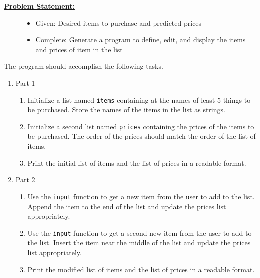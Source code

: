 \documentclass[12pt]{article}
\begin{document}
\begin{description}[labelindent=1cm]
\begin{description}
      
   \item[\textbf{\underline{Problem Statement:}}] \hfill \vspace{0mm}

	\begin{itemize}

		\item Given: Desired items to purchase and predicted prices
		
		\item Complete: Generate a program to define, edit, and display the items and prices of item in the list
	\end{itemize}      


	\end{description}


\newpage
\item[\textbf{\underline{Program Minimum Requirements:}}] \hfill \vspace{0mm}

The program should accomplish the following tasks. 

\begin{enumerate}
	
	\item Part 1 
		\begin{enumerate}
	      \item
	      Initialize a list named \lstinline{items} containing at the names of least 5 things to be purchased. Store the names of the items in the list as strings.  \\
	      \item
	      Initialize a second list named \lstinline{prices} containing the prices of the items to be purchased. The order of the prices should match the order of the list of items.   	
	      \item
	      Print the initial list of items and the list of prices in a readable format.  
		\end{enumerate}	 

	\item Part 2
		\begin{enumerate}
	      \item
	     	Use the \lstinline{input} function to get a new item from the user to add to the list. Append the item to the end of the list and update the prices list appropriately. 
	      \item
	      Use the \lstinline{input} function to get a second new item from the user to add to the list. Insert the item near the middle of the list and update the prices list appropriately. 
	      \item 
	      Print the modified list of items and the list of prices in a readable format.  
		\end{enumerate}	


\end{enumerate}
\end{description}
\end{document}
